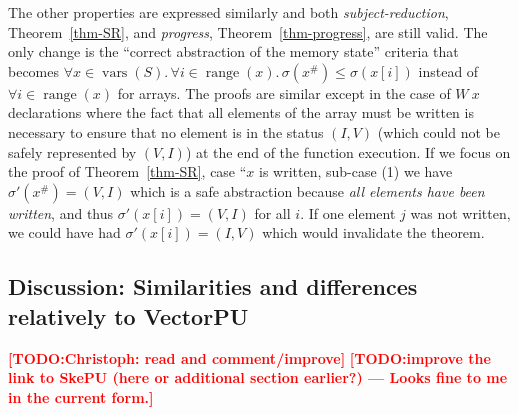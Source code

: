 \documentclass[preprint,12pt]{elsarticle}
\newcommand{\TODO}[1]{\textcolor{red}{\textbf{[TODO:#1]}}}
\DeclareMathOperator{\vars}{vars}
\newcommand{\abs}[1]{#1^\#}
\DeclareMathOperator{\range}{range}
\begin{document}
The other properties are expressed similarly and both \emph{subject-reduction}, 
Theorem~\ref{thm-SR}, and \emph{progress}, Theorem~\ref{thm-progress}, are 
still valid. The only change is the ``correct abstraction of the memory state'' criteria 
that becomes $\forall x\in 
\vars(S).\,\forall i\in\range(x).\, \sigma(\abs x)\leq\sigma(x[i])$ instead of $\forall 
i\in\range(x)$ for arrays. The proofs are similar except in the case of $W~x$ 
declarations where the fact that all elements of the array must be written is necessary 
to ensure that no element is in the status $(I,V)$ (which could not be safely represented 
by $(V,I)$) at the end of the function execution. If we focus on the proof of 
Theorem~\ref{thm-SR}, case ``$x$ is written, sub-case (1) we have $\sigma'(\abs x)=(V,I)$ 
which is a safe abstraction because \emph{all elements have been written}, and thus 
$\sigma'(x[i])=(V,I)$ for all $i$. If one element $j$ was not written, we could have had 
$\sigma'(x[i])=(I,V)$ which would invalidate the theorem.
%
%

\subsection{Discussion: Similarities and differences relatively to VectorPU}

\TODO{Christoph: read and comment/improve}
\TODO{improve the link to SkePU (here or additional section earlier?) --- Looks fine to me in the current form.}
\end{document}
